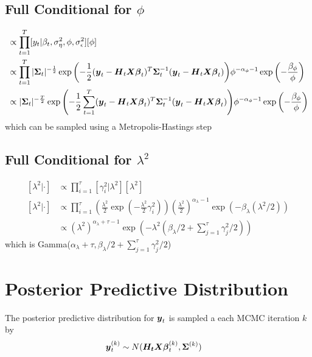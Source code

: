 \documentclass[fleqn]{article}
\def\bm#1{\mbox{\boldmath $#1$}}
\begin{document}
\subsection{Full Conditional for $\phi$}
%
\begin{align*}
  [\phi | \cdot] & \propto \prod_{t = 1}^T [y_t | \beta_t, \sigma^2_\eta, \phi, \sigma^2_\epsilon] [\phi]\\
%
& \propto \prod_{t = 1}^T | \bm{\Sigma}_t |^{ - \frac{1} {2}} \exp{ \left( - \frac{1} {2} (\bm{y}_t - \bm{H}_t \bm{X} \bm{\beta}_t)^T \bm{\Sigma}_t^{ - 1} (\bm{y}_t - \bm{H}_t \bm{X} \bm{\beta}_t) \right) } \phi^{ - \alpha_\phi - 1} \exp{ \left( - \frac{\beta_\phi} {\phi} \right) }\\
%
& \propto | \bm{\Sigma}_t |^{ - \frac{T} {2}} \exp{ \left( - \frac{1} {2} \sum_{t = 1}^T (\bm{y}_t - \bm{H}_t \bm{X} \bm{\beta}_t)^T \bm{\Sigma}_t^{ - 1} (\bm{y}_t - \bm{H}_t \bm{X} \bm{\beta}_t) \right) } \phi^{ - \alpha_\phi - 1} \exp{ \left( - \frac{\beta_\phi} {\phi} \right) }\\
\end{align*}
% 
which can be sampled using a Metropolis-Hastings step
%
\subsection*{Full Conditional for $\lambda^2$}
%
\begin{align*}
%
[\lambda^2 | \cdot] & \propto \prod_{i = 1}^\tau [ \gamma^2_i | \lambda^2] [\lambda^2]\\
%
[\lambda^2 | \cdot] & \propto \prod_{i = 1}^\tau \left( \frac{\lambda^2} {2} \exp{ \left( - \frac{\lambda^2} {2} \gamma^2_i \right) } \right) (\frac{\lambda^2} {2})^{\alpha_\lambda - 1} \exp{ \left( - \beta_\lambda (\lambda^2 /2) \right) }\\
%
& \propto (\lambda^2)^{\alpha_\lambda + \tau - 1} \exp{ \left( - \lambda^2(\beta_\lambda / 2 + \sum_{j = 1}^\tau \gamma^2_j / 2) \right) }
\end{align*}
%
which is Gamma($\alpha_\lambda + \tau, \beta_\lambda / 2 + \sum_{j = 1}^\tau \gamma^2_j / 2$)
%
\section{Posterior Predictive Distribution}
%
The posterior predictive distribution for $\bm{y}_t$ is sampled a each MCMC iteration $k$ by
\begin{align*}
  \bm{y}^{(k)}_t & \sim N(\bm{H_t} \bm{X} \bm{\beta}^{(k)}_t, \bm{\Sigma}^{(k)})
\end{align*}
\end{document}
